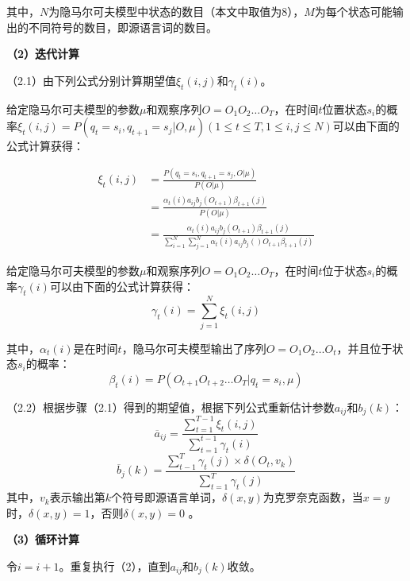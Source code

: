 其中，$N$为隐马尔可夫模型中状态的数目（本文中取值为8），$M$为每个状态可能输出的不同符号的数目，即源语言词的数目。

\textbf{（2）迭代计算}

（2.1）由下列公式分别计算期望值$\xi_t(i,j)$和$\gamma_t(i)$。

给定隐马尔可夫模型的参数$\mu$和观察序列$O=O_1O_2\ldots O_T$，在时间$t$位置状态$s_i$的概率$\xi_t(i,j)=P(q_t=s_i,q_{t+1}=s_j | O, \mu)(1\le t \le T, 1 \le i,j \le N )$可以由下面的公式计算获得：

\begin{equation}
\begin{aligned}
\xi_t(i,j) & = \frac{P(q_t=s_i,q_{t+1}=s_j, O | \mu)}{P(O|\mu)} \\
& = \frac{\alpha_t(i)a_{ij}b_j(O_{t+1})\beta_{t+1}(j)}{P(O|\mu)} \\
& = \frac{\alpha_t(i)a_{ij}b_j(O_{t+1})\beta_{t+1}(j)}{\sum_{i=1}^{N}\sum_{j=1}^N \alpha_t(i)a_{ij}b_j()O_{t+1}\beta_{t+1}(j)}
\end{aligned}
\end{equation}

给定隐马尔可夫模型的参数$\mu$和观察序列$O=O_1O_2\ldots O_T$，在时间$t$位于状态$s_i$的概率$\gamma_t(i)$可以由下面的公式计算获得：
\begin{equation}
\gamma_t(i) = \sum_{j=1}^N \xi _t(i,j)
\end{equation}

其中，$\alpha_t(i)$是在时间$t$，隐马尔可夫模型输出了序列$O=O_1O_2\ldots O_t$，并且位于状态$s_i$的概率：
\begin{equation}
\beta_t(i)=P(O_{t+1}O_{t+2}\ldots O_T | q_t=s_i, \mu)
\end{equation}

（2.2）根据步骤（2.1）得到的期望值，根据下列公式重新估计参数$a_{ij}$和$b_j(k)$：
\begin{equation}
\overline{a}_{ij} = \frac{\sum_{t=1}^{T-1} \xi _t (i,j)}{\sum_{t=1}^{t-1} \gamma_t (i)}
\end{equation}
\begin{equation}
	\overline{b}_j (k) = \frac{\sum_{t-1}^T \gamma_t (j) \times \delta(O_t,v_k)}{\sum_{t=1}^T \gamma_{t} (j)} 
\end{equation}
其中，$v_k$表示输出第$k$个符号即源语言单词，$\delta(x,y)$为克罗奈克函数，当$x=y$时，$\delta(x,y)=1$，否则$\delta(x,y)=0$ 。

\textbf{（3）循环计算}

令$i=i+1$。重复执行（2），直到$a_{ij}$和$b_j(k)$收敛。

